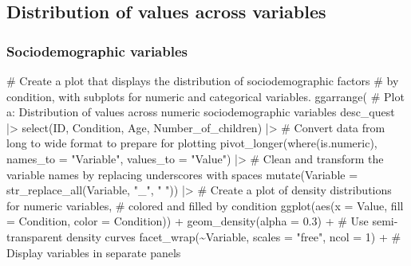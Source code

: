 \documentclass[
  bookmarksnumbered]{article}
\newenvironment{Shaded}{\begin{snugshade}}{\end{snugshade}}
\newcommand{\AttributeTok}[1]{\textcolor[rgb]{0.80,0.80,0.80}{#1}}
\newcommand{\CommentTok}[1]{\textcolor[rgb]{0.50,0.62,0.50}{#1}}
\newcommand{\DecValTok}[1]{\textcolor[rgb]{0.86,0.86,0.80}{#1}}
\newcommand{\FloatTok}[1]{\textcolor[rgb]{0.75,0.75,0.82}{#1}}
\newcommand{\FunctionTok}[1]{\textcolor[rgb]{0.94,0.94,0.56}{#1}}
\newcommand{\NormalTok}[1]{\textcolor[rgb]{0.80,0.80,0.80}{#1}}
\newcommand{\SpecialCharTok}[1]{\textcolor[rgb]{0.86,0.64,0.64}{#1}}
\newcommand{\StringTok}[1]{\textcolor[rgb]{0.80,0.58,0.58}{#1}}
\begin{document}
\subsection{Distribution of values across variables}\label{distribution-of-values-across-variables}

\subsubsection{Sociodemographic variables}\label{sociodemographic-variables}

\begin{Shaded}
\begin{Highlighting}[]
\CommentTok{\# Create a plot that displays the distribution of sociodemographic factors}
\CommentTok{\# by condition, with subplots for numeric and categorical variables.}
\FunctionTok{ggarrange}\NormalTok{(}
  \CommentTok{\# Plot a: Distribution of values across numeric sociodemographic variables}
\NormalTok{  desc\_quest }\SpecialCharTok{|\textgreater{}}
    \FunctionTok{select}\NormalTok{(ID, Condition, Age, Number\_of\_children) }\SpecialCharTok{|\textgreater{}}
    \CommentTok{\# Convert data from long to wide format to prepare for plotting}
    \FunctionTok{pivot\_longer}\NormalTok{(}\FunctionTok{where}\NormalTok{(is.numeric),}
                 \AttributeTok{names\_to =} \StringTok{"Variable"}\NormalTok{,}
                 \AttributeTok{values\_to =} \StringTok{"Value"}\NormalTok{) }\SpecialCharTok{|\textgreater{}} 
    \CommentTok{\# Clean and transform the variable names by replacing underscores with spaces}
    \FunctionTok{mutate}\NormalTok{(}\AttributeTok{Variable =} \FunctionTok{str\_replace\_all}\NormalTok{(Variable, }\StringTok{"\_"}\NormalTok{, }\StringTok{" "}\NormalTok{)) }\SpecialCharTok{|\textgreater{}}
    \CommentTok{\# Create a plot of density distributions for numeric variables, }
    \CommentTok{\# colored and filled by condition}
    \FunctionTok{ggplot}\NormalTok{(}\FunctionTok{aes}\NormalTok{(}\AttributeTok{x =}\NormalTok{ Value, }\AttributeTok{fill =}\NormalTok{ Condition, }\AttributeTok{color =}\NormalTok{ Condition)) }\SpecialCharTok{+}
    \FunctionTok{geom\_density}\NormalTok{(}\AttributeTok{alpha =} \FloatTok{0.3}\NormalTok{) }\SpecialCharTok{+}  \CommentTok{\# Use semi{-}transparent density curves}
    \FunctionTok{facet\_wrap}\NormalTok{(}\SpecialCharTok{\textasciitilde{}}\NormalTok{Variable, }\AttributeTok{scales =} \StringTok{"free"}\NormalTok{, }\AttributeTok{ncol =} \DecValTok{1}\NormalTok{) }\SpecialCharTok{+}  \CommentTok{\# Display variables in separate panels}

\end{Highlighting}
\end{Shaded}
\end{document}
